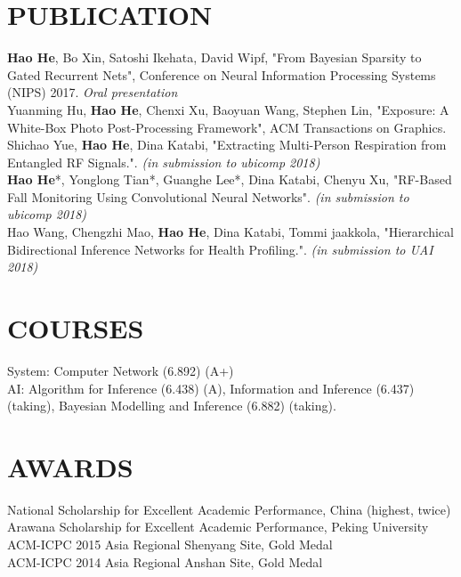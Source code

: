 \documentclass[margin]{res}
\newcommand{\Bullet}[1]{{\raisebox{0.25ex}{\tiny$\bullet$\ }}{#1}\\}
\begin{document}
\begin{resume}
\section{PUBLICATION}
\Bullet{\textbf{Hao He}, Bo Xin, Satoshi Ikehata, David Wipf, "From Bayesian Sparsity to Gated Recurrent Nets",  Conference on Neural Information Processing
Systems (NIPS) 2017. \emph{Oral presentation}}
\Bullet{Yuanming Hu, \textbf{Hao He}, Chenxi Xu, Baoyuan Wang, Stephen Lin, "Exposure: A White-Box Photo Post-Processing Framework", ACM Transactions on Graphics.}
\Bullet{Shichao Yue, \textbf{Hao He}, Dina Katabi, "Extracting Multi-Person Respiration from Entangled RF Signals.". \emph{(in submission to ubicomp 2018)}}
\Bullet{\textbf{Hao He}*, Yonglong Tian*, Guanghe Lee*, Dina Katabi, Chenyu Xu, "RF-Based Fall Monitoring Using Convolutional Neural Networks". \emph{(in submission to ubicomp 2018)}}
\Bullet{Hao Wang, Chengzhi Mao, \textbf{Hao He}, Dina Katabi, Tommi jaakkola, "Hierarchical Bidirectional Inference Networks for Health Profiling.". \emph{(in submission to UAI 2018)}}
\vspace{-5mm}

\section{COURSES}
\Bullet{System: Computer Network (6.892) (A+)}
\Bullet{AI: Algorithm for Inference (6.438) (A), Information and Inference (6.437) (taking), Bayesian Modelling and Inference (6.882) (taking).}
\vspace{-5mm}

\section{AWARDS}
    \Bullet{National Scholarship for Excellent Academic Performance, China (highest, twice)} 
    \Bullet{Arawana Scholarship for Excellent Academic Performance, Peking University}
    \Bullet{ACM-ICPC 2015 Asia Regional Shenyang Site, Gold Medal}
    \Bullet{ACM-ICPC 2014 Asia Regional Anshan Site, Gold Medal}


\end{resume}
\end{document}
